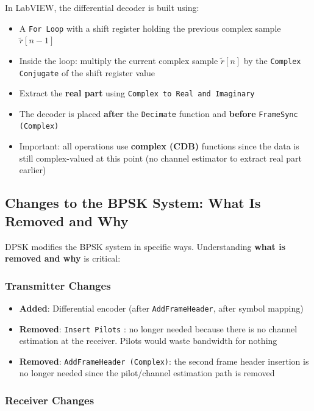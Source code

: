 In LabVIEW, the differential decoder is built using:

\begin{itemize}
\item A \texttt{For Loop} with a shift register holding the previous complex sample $\tilde{r}[n-1]$
\item Inside the loop: multiply the current complex sample $\tilde{r}[n]$ by the \texttt{Complex Conjugate} of the shift register value
\item Extract the \textbf{real part} using \texttt{Complex to Real and Imaginary}
\item The decoder is placed \textbf{after} the \texttt{Decimate} function and \textbf{before} \texttt{FrameSync (Complex)}
\item Important: all operations use \textbf{complex (CDB)} functions since the data is still complex-valued at this point (no channel estimator to extract real part earlier)
\end{itemize}

\subsection{Changes to the BPSK System: What Is Removed and Why}

DPSK modifies the BPSK system in specific ways. Understanding \textbf{what is removed and why} is critical:

\subsubsection{Transmitter Changes}

\begin{itemize}
\item \textbf{Added}: Differential encoder (after \texttt{AddFrameHeader}, after symbol mapping)
\item \textbf{Removed}: \texttt{Insert Pilots} : no longer needed because there is no channel estimation at the receiver. Pilots would waste bandwidth for nothing
\item \textbf{Removed}: \texttt{AddFrameHeader (Complex)}: the second frame header insertion is no longer needed since the pilot/channel estimation path is removed
\end{itemize}

\subsubsection{Receiver Changes}


